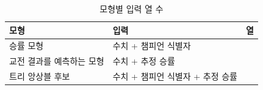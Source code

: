 \begin{table}[!t]
  \centering
  \caption{모형별 입력 열 수}
  \label{tab:input-dims}
  \small
  \begin{tabular}{@{}llr@{}}
    \toprule
    모형 & 입력 & 열 \\
    \midrule
    승률 모형 & 수치 \dimNumeric{} + 챔피언 식별자 \dimChampSlots{} & \dimExpanded{} \\
    교전 결과를 예측하는 모형 & 수치 \dimNumeric{} + 추정 승률 & \dimInputQ{} \\
    트리 앙상블 후보 & 수치 \dimNumeric{} + 챔피언 식별자 \dimChampSlots{} + 추정 승률 & \dimInputLgbm{} \\
    \bottomrule
  \end{tabular}
\end{table}
